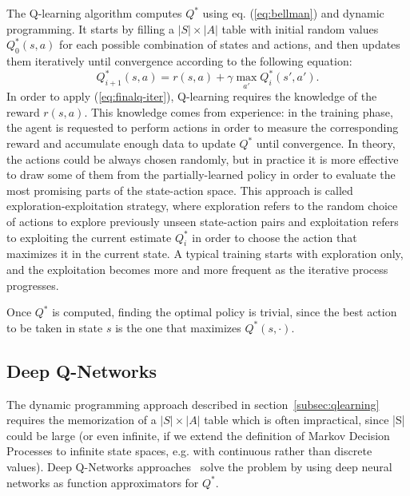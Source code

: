 \documentclass{article}
\begin{document}
The Q-learning algorithm computes $Q^*$ using eq. (\ref{eq:bellman}) and dynamic programming. It starts by filling a $|S|\times |A|$ table with initial random values $Q^*_0(s,a)$ for each possible combination of states and actions, and then updates them iteratively until convergence according to the following equation:
\begin{equation}
Q^*_{i+1}(s,a) = r(s,a) + \gamma \max_{a'} Q^*_i(s', a') .
\label{eq:finalq-iter}
\end{equation}
In order to apply (\ref{eq:finalq-iter}), Q-learning requires the knowledge of the reward $r(s,a)$. This knowledge comes from experience: in the training phase, the agent is requested to perform actions in order to measure the corresponding reward and accumulate enough data to update $Q^*$ until convergence. In theory, the actions could be always chosen randomly, but in practice it is more effective to draw some of them from the partially-learned policy in order to evaluate the most promising parts of the state-action space. This approach is called exploration-exploitation strategy, where exploration refers to the random choice of actions to explore previously unseen state-action pairs and exploitation refers to exploiting the current estimate $Q^*_i$ in order to choose the action that maximizes it in the current state. A typical training starts with exploration only, and the exploitation becomes more and more frequent as the iterative process progresses.

Once $Q^*$ is computed, finding the optimal policy is trivial, since the best action to be taken in state $s$ is the one that maximizes $Q^*(s,\cdot)$. 


\subsection{Deep Q-Networks}
\label{subsec:deepqnet}
The dynamic programming approach described in section~\ref{subsec:qlearning} requires the memorization of a $|S|\times |A|$ table which is often impractical, since |S| could be large (or even infinite, if we extend the definition of Markov Decision Processes to infinite state spaces, e.g. with continuous rather than discrete values). Deep Q-Networks approaches~\cite{mnih2015human,mnih-atari-2013} solve the problem by using deep neural networks as function approximators for $Q^*$. 
\end{document}
